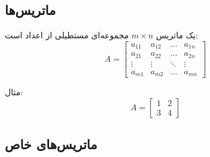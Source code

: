\subsection{ماتریس‌ها}
\begin{definition}[ماتریس]
	یک ماتریس $m \times n$ مجموعه‌ای مستطیلی از اعداد است:
	\[ A = \begin{bmatrix} a_{11} & a_{12} & \dots & a_{1n} \\ a_{21} & a_{22} & \dots & a_{2n} \\ \vdots & \vdots & \ddots & \vdots \\ a_{m1} & a_{m2} & \dots & a_{mn} \end{bmatrix} \]
	
	\begin{example}
		مثال: 
		\[ A = \begin{bmatrix} 1 & 2 \\ 3 & 4 \end{bmatrix} \]
	\end{example}
\end{definition}
\subsection{ماتریس‌های خاص}
	
